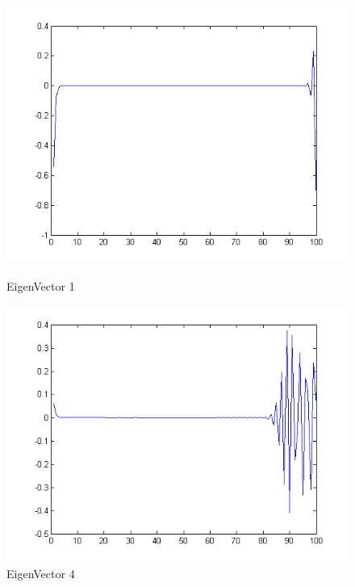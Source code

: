 \documentclass[12pt]{article}
\begin{document}
\begin{figure}[H]
\begin{minipage}[b]{0.5\linewidth}
\includegraphics[scale=.5]{v2p1.png}
\caption{EigenVector 1}
\end{minipage}
\begin{minipage}[b]{0.5\linewidth}
\includegraphics[scale=.5]{v2p4.png}
\caption{EigenVector 4}
\end{minipage}
\end{figure}
\end{document}
